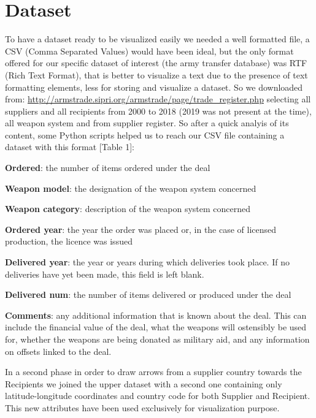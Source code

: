 \documentclass[twocolumn]{article}
\begin{document}
\section{Dataset}
%
To have a dataset ready to be visualized easily we needed a well formatted file, a CSV (Comma Separated Values) would have been ideal, but the only format offered for our specific dataset of interest (the army transfer database) was RTF (Rich Text Format), that is better to visualize a text due to the presence of text formatting elements, less for storing and visualize a dataset. So we downloaded from: \url{http://armstrade.sipri.org/armstrade/page/trade_register.php} selecting all suppliers and all recipients from 2000 to 2018 (2019 was not present at the time), all weapon system and from supplier register. So after a quick analyis of its content, some Python scripts helped us to reach our CSV file containing a dataset with this format [Table 1]:
\begin{list}{•}{•}
\item \textbf{Ordered}: the number of items ordered under the deal
\item \textbf{Weapon model}: the designation of the weapon system concerned
\item \textbf{Weapon category}: description of the weapon system concerned
\item \textbf{Ordered year}: the year the order was placed or, in the case of licensed production, the licence was issued
\item \textbf{Delivered year}: the year or years during which deliveries took place. If no deliveries have yet been made, this field is left blank.
\item \textbf{Delivered num}: the number of items delivered or produced under the deal
\item \textbf{Comments}: any additional information that is known about the deal. This can include the financial value of the deal, what the weapons will ostensibly be used for, whether the weapons are being donated as military aid, and any information on offsets linked to the deal.
 
\item 
\item
\end{list}



In a second phase in order to draw arrows from a supplier country towards the Recipients we joined the upper dataset with a second one containing only latitude-longitude coordinates and country code for both Supplier and Recipient. This new attributes have been used exclusively for visualization purpose.
\end{document}
